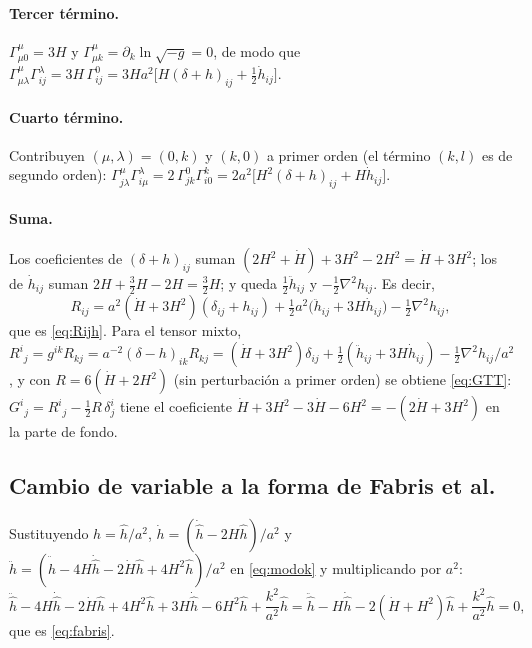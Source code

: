 \paragraph{Tercer término.} $\Gamma^\mu_{\mu 0}=3H$ y $\Gamma^\mu_{\mu k}=\partial_k\ln\sqrt{-g}=0$, de modo que $\Gamma^\mu_{\mu\lambda}\Gamma^\lambda_{ij}=3H\,\Gamma^0_{ij}=3Ha^2\big[H(\delta+h)_{ij}+\tfrac12\dot h_{ij}\big]$.

\paragraph{Cuarto término.} Contribuyen $(\mu,\lambda)=(0,k)$ y $(k,0)$ a primer orden (el término $(k,l)$ es de segundo orden): $\Gamma^\mu_{j\lambda}\Gamma^\lambda_{i\mu}=2\,\Gamma^0_{jk}\Gamma^k_{i0}=2a^2\big[H^2(\delta+h)_{ij}+H\dot h_{ij}\big]$.

\paragraph{Suma.} Los coeficientes de $(\delta+h)_{ij}$ suman $(2H^2+\dot H)+3H^2-2H^2=\dot H+3H^2$; los de $\dot h_{ij}$ suman $2H+\tfrac32H-2H=\tfrac32H$; y queda $\tfrac12\ddot h_{ij}$ y $-\tfrac12\nabla^2h_{ij}$. Es decir,
\begin{equation}
R_{ij}=a^2(\dot H+3H^2)(\delta_{ij}+h_{ij})+\tfrac12a^2\big(\ddot h_{ij}+3H\dot h_{ij}\big)-\tfrac12\nabla^2h_{ij},
\end{equation}
que es \eqref{eq:Rijh}. Para el tensor mixto, $R^i{}_j=g^{ik}R_{kj}=a^{-2}(\delta-h)_{ik}R_{kj}=(\dot H+3H^2)\delta_{ij}+\tfrac12(\ddot h_{ij}+3H\dot h_{ij})-\tfrac12\nabla^2h_{ij}/a^2$, y con $R=6(\dot H+2H^2)$ (sin perturbación a primer orden) se obtiene \eqref{eq:GTT}: $G^i{}_j=R^i{}_j-\tfrac12R\,\delta^i_j$ tiene el coeficiente $\dot H+3H^2-3\dot H-6H^2=-(2\dot H+3H^2)$ en la parte de fondo.

\subsection{Cambio de variable a la forma de Fabris et al.}

Sustituyendo $h=\hat h/a^2$, $\dot h=(\dot{\hat h}-2H\hat h)/a^2$ y $\ddot h=(\ddot{\hat h}-4H\dot{\hat h}-2\dot H\hat h+4H^2\hat h)/a^2$ en \eqref{eq:modok} y multiplicando por $a^2$:
\begin{equation}
\ddot{\hat h}-4H\dot{\hat h}-2\dot H\hat h+4H^2\hat h+3H\dot{\hat h}-6H^2\hat h+\frac{k^2}{a^2}\hat h=\ddot{\hat h}-H\dot{\hat h}-2(\dot H+H^2)\hat h+\frac{k^2}{a^2}\hat h=0,
\end{equation}
que es \eqref{eq:fabris}.

